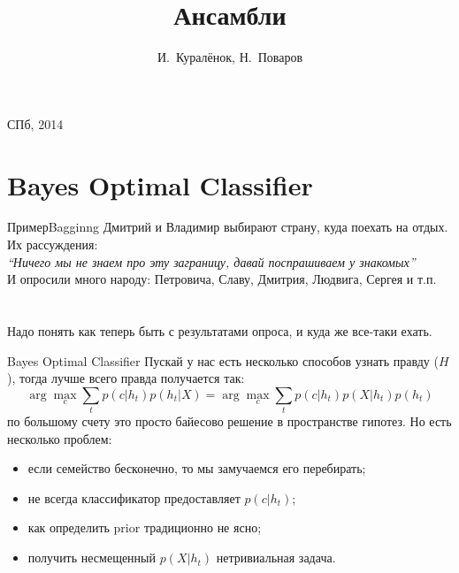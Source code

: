 \documentclass[14pt, fleqn, xcolor={dvipsnames, table}]{beamer}
\title{Ансамбли\\\small{}}
\author[]{\small{%
И.~Куралёнок,
Н.~Поваров}}
\date{}
\begin{document}
\begin{frame}
\maketitle
\small
\begin{center}
\vspace{-60pt}
\vspace{80pt}
\footnotesize СПб, 2014
\end{center}
\end{frame}

\section{Bayes Optimal Classifier}
\begin{frame}{Пример}{Bagginng}
Дмитрий и Владимир выбирают страну, куда поехать на отдых. Их рассуждения: \\
\textit{``Ничего мы не знаем про эту заграницу, давай поспрашиваем у знакомых''} \\
И опросили много народу: Петровича, Славу, Дмитрия, Людвига, Сергея и т.п.\\
~\\
~\\
Надо понять как теперь быть с результатами опроса, и куда же все-таки ехать.
\end{frame}

\begin{frame}{Bayes Optimal Classifier}
Пускай у нас есть несколько способов узнать правду ($H$), тогда лучше всего правда получается так:
{\small
$$
\arg \max_c \sum_t p(c|h_t) p(h_t | X) = \arg \max_c \sum_t p(c|h_t) p(X | h_t) p(h_t) 
$$
}
по большому счету это просто байесово решение в пространстве гипотез. Но есть несколько проблем:
\small
\begin{itemize}
  \item если семейство бесконечно, то мы замучаемся его перебирать;
  \item не всегда классификатор предоставляет $p(c|h_t)$;
  \item как определить prior традиционно не ясно;
  \item получить несмещенный $p(X|h_t)$ нетривиальная задача.
\end{itemize}
\end{frame}
\end{document}
